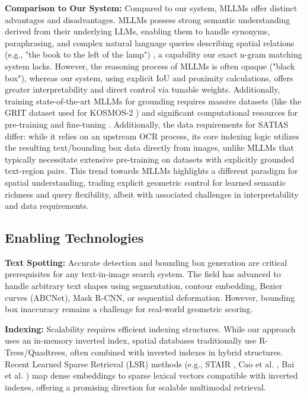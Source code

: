 \documentclass[sigconf,screen]{acmart}
\begin{document}
\textbf{Comparison to Our System:} Compared to our system, MLLMs offer distinct advantages and disadvantages. MLLMs possess strong semantic understanding derived from their underlying LLMs, enabling them to handle synonyms, paraphrasing, and complex natural language queries describing spatial relations (e.g., "the book to the left of the lamp") \cite{Huang24, Yin24}, a capability our exact n-gram matching system lacks. However, the reasoning process of MLLMs is often opaque ("black box"), whereas our system, using explicit IoU and proximity calculations, offers greater interpretability and direct control via tunable weights. Additionally, training state-of-the-art MLLMs for grounding requires massive datasets (like the GRIT dataset used for KOSMOS-2 \cite{Huang24}) and significant computational resources for pre-training and fine-tuning \cite{Yin24}. Additionally, the data requirements for SATIAS differ: while it relies on an upstream OCR process, its core indexing logic utilizes the resulting text/bounding box data directly from images, unlike MLLMs that typically necessitate extensive pre-training on datasets with explicitly grounded text-region pairs. This trend towards MLLMs highlights a different paradigm for spatial understanding, trading explicit geometric control for learned semantic richness and query flexibility, albeit with associated challenges in interpretability and data requirements.

\subsection{Enabling Technologies}

\textbf{Text Spotting:} Accurate detection and bounding box generation are critical prerequisites for any text-in-image search system. The field has advanced to handle arbitrary text shapes using segmentation, contour embedding, Bezier curves (ABCNet), Mask R-CNN, or sequential deformation. However, bounding box inaccuracy remains a challenge for real-world geometric scoring.

\textbf{Indexing:} Scalability requires efficient indexing structures. While our approach uses an in-memory inverted index, spatial databases traditionally use R-Trees/Quadtrees, often combined with inverted indexes in hybrid structures. Recent Learned Sparse Retrieval (LSR) methods (e.g., STAIR \cite{Chen23}, Cao et al. \cite{Cao23}, Bai et al. \cite{Bai24}) map dense embeddings to sparse lexical vectors compatible with inverted indexes, offering a promising direction for scalable multimodal retrieval.
\end{document}
